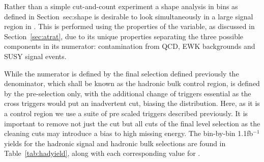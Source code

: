 Rather than a simple cut-and-count experiment a shape analysis in \HT bins as defined in Section~{sec:shape} is desirable to look simultaneously in a large signal region in \HT. This is performed using the properties of the \RaT variable, as discussed in Section~\ref{sec:atrat}, due to its unique properties separating the three possible components in its numerator: contamination from QCD, EWK backgrounds and SUSY signal events. 

While the numerator is defined by the final selection defined previously the denominator, which shall be known as the hadronic bulk control region, is defined by the pre-selection only, with the additional change of triggers essential as the cross triggers would put an inadvertent \MHT cut, biasing the \alt distribution. Here, as it is a control region we use a suite of pre scaled \HT triggers described previously. It is important to remove not just the \alt cut but all cuts of the final level selection as the cleaning cuts may introduce a bias to high missing energy. The bin-by-bin 1.1fb$^{-1}$ yields for the hadronic signal and hadronic bulk selections are found in Table~\ref{tab:hadyield}, along with each corresponding value for \RaT.

